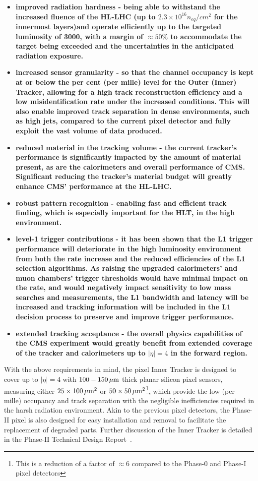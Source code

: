 \begin{itemize}
\item \bf{improved radiation hardness} - being able to withstand the increased fluence of the HL-LHC (up to $2.3\times10^{16} n_{eq}/cm^{2}$ for the innermost layers)and operate efficiently up to the targeted luminosity of 3000\fbinv, with a margin of $\approx50\%$ to accommodate the target being exceeded and the uncertainties in the anticipated radiation exposure.
\item \bf{increased sensor granularity} - so that the channel occupancy is kept at or below the per cent (per mille) level for the Outer (Inner) Tracker, allowing for a high track reconstruction efficiency and a low misidentification rate under the increased \PU conditions. This will also enable improved track separation in dense environments, such as high \pT jets, compared to the current pixel detector and fully exploit the vast volume of data produced.
\item \bf{reduced material in the tracking volume} - the current tracker's performance is significantly impacted by the amount of material present, as are the calorimeters and overall performance of CMS.
Significant reducing the tracker's material budget will greatly enhance CMS' performance at the HL-LHC.
\item \bf{robust pattern recognition} - enabling fast and efficient track finding, which is especially important for the HLT, in the high \PU environment.
\item \bf{level-1 trigger contributions} - it has been shown that the L1 trigger performance will deteriorate in the high luminosity environment from both the rate increase and the reduced efficiencies of the L1 selection algorithms.
As raising the upgraded calorimeters' and muon chambers' trigger thresholds would have minimal impact on the rate, and 	would negatively impact sensitivity to low mass searches and measurements, the L1 bandwidth and latency will be increased and tracking information will be included in the L1 decision process to preserve and improve trigger performance.
\item \bf{extended tracking acceptance} - the overall physics capabilities of the CMS experiment would greatly benefit from extended coverage of the tracker and calorimeters up to $|\eta| = 4$ in the forward region.
\end{itemize}

With the above requirements in mind, the pixel Inner Tracker is designed to cover up to $|\eta| = 4$ with $100-150\,\mu\text{m}$ thick planar silicon pixel sensors, measuring either $25\times100\,\mu\text{m}^{2}$ or $50\times50\,\mu\text{m}^{2}$\footnote{This is a reduction of a factor of $\approx 6$ compared to the Phase-0 and Phase-I pixel detectors}, which provide the low (per mille) occupancy and track separation with the negligible inefficiencies required in the harsh radiation environment.
Akin to the previous pixel detectors, the Phase-II pixel is also designed for easy installation and removal to facilitate the replacement of degraded parts.
Further discussion of the Inner Tracker is detailed in the Phase-II Technical Design Report~\cite{P2TrackerTDR}.

